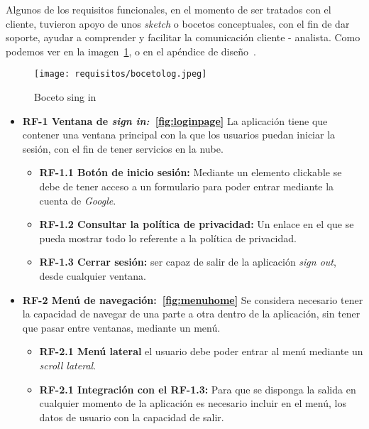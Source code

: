 Algunos de los requisitos funcionales, en el momento de ser tratados con el cliente, tuvieron apoyo de unos \emph{sketch} o bocetos conceptuales, con el fin de dar soporte, ayudar a comprender y facilitar la comunicación cliente - analista. Como podemos ver en la imagen~\ref{fig:bocetolog}, o en el apéndice de diseño~\pageref{diseño}.

\begin{figure}[H]
	\centering
	\texttt{[image: requisitos/bocetolog.jpeg]}
	\caption{Boceto sing in}\label{fig:bocetolog}
\end{figure}

\begin{itemize}
\tightlist
	\item \textbf{RF-1 Ventana de \emph{sign in:}~\ref{fig:loginpage}} La aplicación tiene que contener una ventana principal con la que los usuarios puedan iniciar la sesión, con el fin de tener servicios en la nube.
	
	\begin{itemize}
	\tightlist
	\item \textbf{RF-1.1 Botón de inicio sesión:} Mediante un elemento clickable se debe de tener acceso a un formulario para poder entrar mediante la cuenta de \emph{Google}.
	\item \textbf{RF-1.2 Consultar la política de privacidad:} Un enlace en el que se pueda mostrar todo lo referente a la política de privacidad.
	\item \textbf{RF-1.3 Cerrar sesión:} ser capaz de salir de la aplicación \emph{sign out}, desde cualquier ventana.
	\end{itemize}
	
	\item \textbf{RF-2 Menú de navegación:~\ref{fig:menuhome}} Se considera necesario tener la capacidad de navegar de una parte a otra dentro de la aplicación, sin tener que pasar entre ventanas, mediante un menú. 
	
	\begin{itemize}
		\tightlist
		\item \textbf{RF-2.1 Menú lateral} el usuario debe poder entrar al menú mediante un \emph{scroll lateral}.
		\item \textbf{RF-2.1 Integración con el RF-1.3:} Para que se disponga la salida en cualquier momento de la aplicación es necesario incluir en el menú, los datos de usuario con la capacidad de salir.
	\end{itemize}


\end{itemize}

